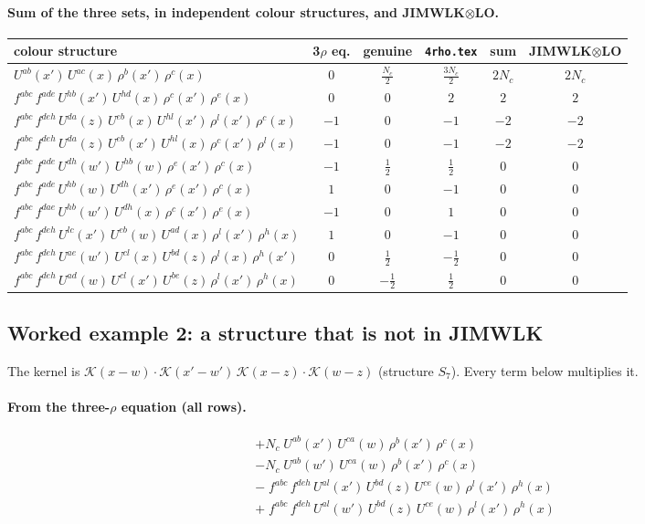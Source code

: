 \documentclass[10pt]{article}
\numberwithin{equation}{section}
\begin{document}
\paragraph{Sum of the three sets, in independent colour structures, and JIMWLK$\otimes$LO.}
\begin{center}\small\begin{tabular}{@{}l c c c c c@{}}
colour structure & 3$\rho$ eq. & genuine & \texttt{4rho.tex} & sum & JIMWLK$\otimes$LO\\ \hline
$U^{ab}(x')\,U^{ac}(x)\,\rho^{b}(x')\,\rho^{c}(x)$ & $0$ & $\tfrac{N_c}{2}$ & $\tfrac{3N_c}{2}$ & $2 N_c$ & $2 N_c$\\
$f^{abc}\,f^{ade}\,U^{hb}(x')\,U^{hd}(x)\,\rho^{c}(x')\,\rho^{e}(x)$ & $0$ & $0$ & $2$ & $2$ & $2$\\
$f^{abc}\,f^{deh}\,U^{da}(z)\,U^{eb}(x)\,U^{hl}(x')\,\rho^{l}(x')\,\rho^{c}(x)$ & $-1$ & $0$ & $-1$ & $-2$ & $-2$\\
$f^{abc}\,f^{deh}\,U^{da}(z)\,U^{eb}(x')\,U^{hl}(x)\,\rho^{c}(x')\,\rho^{l}(x)$ & $-1$ & $0$ & $-1$ & $-2$ & $-2$\\
$f^{abc}\,f^{ade}\,U^{dh}(w')\,U^{hb}(w)\,\rho^{e}(x')\,\rho^{c}(x)$ & $-1$ & $\tfrac12$ & $\tfrac12$ & $0$ & $0$\\
$f^{abc}\,f^{ade}\,U^{hb}(w)\,U^{dh}(x')\,\rho^{e}(x')\,\rho^{c}(x)$ & $1$ & $0$ & $-1$ & $0$ & $0$\\
$f^{abc}\,f^{dae}\,U^{hb}(w')\,U^{dh}(x)\,\rho^{c}(x')\,\rho^{e}(x)$ & $-1$ & $0$ & $1$ & $0$ & $0$\\
$f^{abc}\,f^{deh}\,U^{lc}(x')\,U^{eb}(w)\,U^{ad}(x)\,\rho^{l}(x')\,\rho^{h}(x)$ & $1$ & $0$ & $-1$ & $0$ & $0$\\
$f^{abc}\,f^{deh}\,U^{ae}(w')\,U^{cl}(x)\,U^{bd}(z)\,\rho^{l}(x)\,\rho^{h}(x')$ & $0$ & $\tfrac12$ & $- \tfrac12$ & $0$ & $0$\\
$f^{abc}\,f^{deh}\,U^{ad}(w)\,U^{cl}(x')\,U^{be}(z)\,\rho^{l}(x')\,\rho^{h}(x)$ & $0$ & $- \tfrac12$ & $\tfrac12$ & $0$ & $0$\\
\end{tabular}\end{center}

\subsection{Worked example 2: a structure that is not in JIMWLK}
The kernel is $\mathcal{K}(x-w)\cdot\mathcal{K}(x'-w')\,\mathcal{K}(x-z)\cdot\mathcal{K}(w-z)$ (structure $S_{7}$). Every term below multiplies it.
\paragraph{From the three-$\rho$ equation (all rows).}
\begin{align*}
&+N_c\;U^{ab}(x')\,U^{ca}(w)\,\rho^{b}(x')\,\rho^{c}(x)\\&-N_c\;U^{ab}(w')\,U^{ca}(w)\,\rho^{b}(x')\,\rho^{c}(x)\\&-\;f^{abc}\,f^{deh}\,U^{al}(x')\,U^{bd}(z)\,U^{ce}(w)\,\rho^{l}(x')\,\rho^{h}(x)\\&+\;f^{abc}\,f^{deh}\,U^{al}(w')\,U^{bd}(z)\,U^{ce}(w)\,\rho^{l}(x')\,\rho^{h}(x)
\end{align*}
\end{document}
